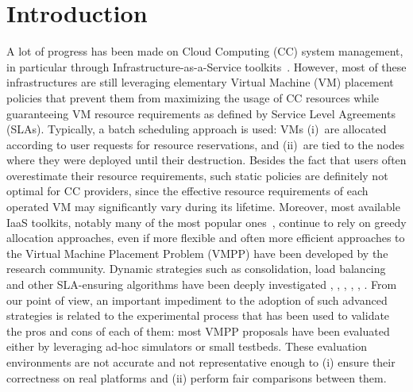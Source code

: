 \section{Introduction}
\label{sec:intro}

A lot of progress has been made on Cloud Computing (CC) system
management, in particular through Infrastructure-as-a-Service
toolkits~\cite{moreno:2012}. However, most of these infrastructures
are still leveraging elementary Virtual Machine (VM) placement
policies that prevent them from maximizing the usage of CC resources
while guaranteeing VM resource requirements as defined by Service
Level Agreements (SLAs).
Typically, a batch scheduling approach is used: VMs (i)~are allocated
according to user requests for resource reservations, and (ii)~are
tied to the nodes where they were deployed until their
destruction. Besides the fact that users often overestimate their
resource requirements, such static policies are definitely not optimal
for CC providers, since the effective resource requirements of each
operated VM may significantly vary during its lifetime.
Moreover, most available IaaS toolkits, notably many of the most
popular ones~\cite{openstack, opennebula, cloudstack}, continue to
rely on greedy allocation approaches, even if more flexible and often
more efficient approaches to the Virtual Machine Placement Problem
(VMPP) have been developed by the research community. Dynamic
strategies such as consolidation, load balancing and other
SLA-ensuring algorithms have been deeply investigated
\cite{Hermenier:2009:ECM:1508293.1508300}, \cite{feller:ccgrid12},
\cite{quesnel:cpe2012}, \cite{5935254}, \cite{5715067},
\cite{5328077}.    From our point of view,
an important impediment to the adoption of such advanced strategies is
related to the experimental process that has been used to validate the
pros and cons of each of them: most VMPP proposals have been evaluated
either by leveraging ad-hoc simulators or small testbeds. These
evaluation environments are not accurate and not representative enough
to (i) ensure their correctness on real platforms and (ii) perform
fair comparisons between them.

